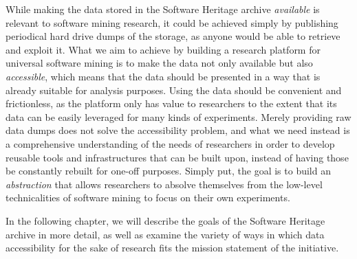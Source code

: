 While making the data stored in the Software Heritage archive \emph{available}
is relevant to software mining research, it could be achieved simply by
publishing periodical hard drive dumps of the storage, as anyone would be able
to retrieve and exploit it.
What we aim to achieve by building a research platform for universal software
mining is to make the data not only available but also \emph{accessible}, which
means that the data should be presented in a way that is already suitable for
analysis purposes. Using the data should be convenient and frictionless,
as the platform only has value to researchers to the extent that its data can
be easily leveraged for many kinds of experiments. Merely providing raw data
dumps does not solve the accessibility problem, and what we need instead is a
comprehensive understanding of the needs of researchers in order to develop
reusable tools and infrastructures that can be built upon, instead of having
those be constantly rebuilt for one-off purposes. Simply put, the goal is to
build an \emph{abstraction} that allows researchers to absolve themselves from
the low-level technicalities of software mining to focus on their own
experiments.

In the following chapter, we will describe the goals of the Software Heritage
archive in more detail, as well as examine the variety of ways in which data
accessibility for the sake of research fits the mission statement of the
initiative.
